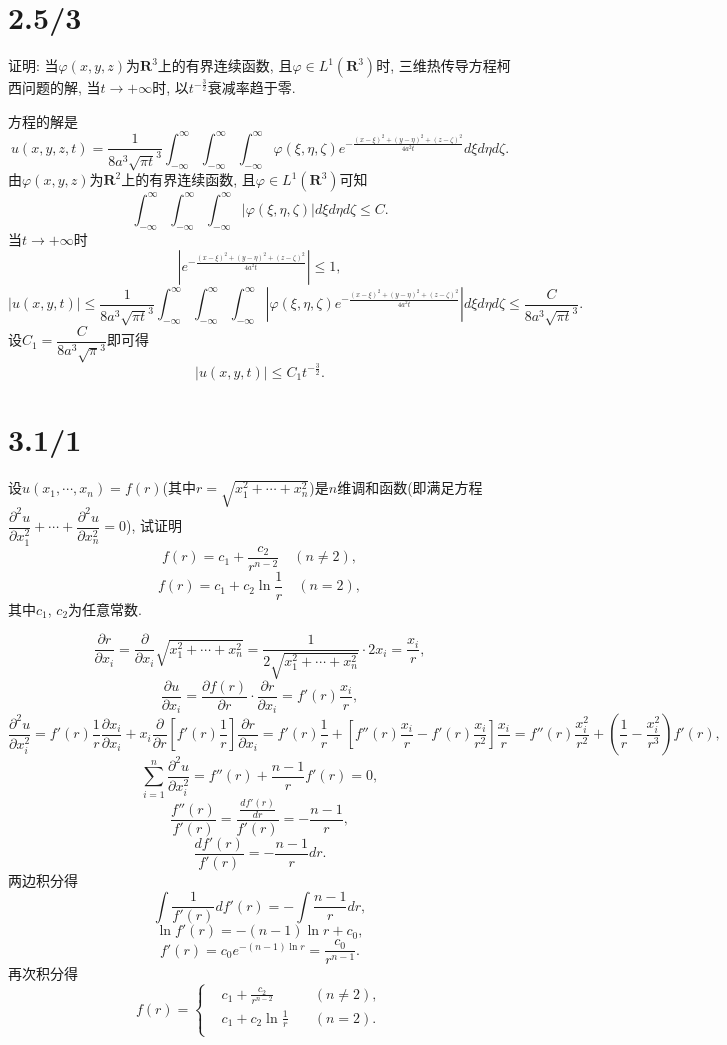 \documentclass[11pt,a4paper]{article}
\begin{document}
\section{2.5/3}
\begin{problem}
证明: 当$\varphi(x,y,z)$为$\mathbf{R}^3$上的有界连续函数, 且$\varphi\in L^1(\mathbf{R}^3)$时, 三维热传导方程柯西问题的解, 当$t\to+\infty$时, 以$t^{-\frac{3}{2}}$衰减率趋于零.
\end{problem}

方程的解是
$$u(x,y,z,t)=\frac{1}{8a^3\sqrt{\pi t}^3}\int_{-\infty}^\infty\int_{-\infty}^\infty\int_{-\infty}^\infty\varphi(\xi,\eta,\zeta)e^{-\frac{(x-\xi)^2+(y-\eta)^2+(z-\zeta)^2}{4a^2t}}d\xi d\eta d\zeta.$$
由$\varphi(x,y,z)$为$\mathbf{R}^2$上的有界连续函数, 且$\varphi\in L^1(\mathbf{R}^3)$可知
$$\int_{-\infty}^\infty\int_{-\infty}^\infty\int_{-\infty}^\infty|\varphi(\xi,\eta,\zeta)|d\xi d\eta d\zeta\leqslant C.$$
当$t\to+\infty$时
$$\left|e^{-\frac{(x-\xi)^2+(y-\eta)^2+(z-\zeta)^2}{4a^2t}}\right|\leqslant1,$$
$$|u(x,y,t)|\leqslant \frac{1}{8a^3\sqrt{\pi t}^3}\int_{-\infty}^\infty\int_{-\infty}^\infty\int_{-\infty}^\infty\left|\varphi(\xi,\eta,\zeta)e^{-\frac{(x-\xi)^2+(y-\eta)^2+(z-\zeta)^2}{4a^2t}}\right|d\xi d\eta d\zeta\leqslant\frac{C}{8a^3\sqrt{\pi t}^3}.$$
设$C_1=\dfrac{C}{8a^3\sqrt{\pi}^3}$即可得
$$|u(x,y,t)|\leqslant C_1t^{-\frac{3}{2}}.$$

\section{3.1/1}
\begin{problem}
设$u(x_1,\cdots,x_n)=f(r)$(其中$r=\sqrt{x_1^2+\cdots+x_n^2}$)是$n$维调和函数(即满足方程$\dfrac{\partial^2u}{\partial x_1^2}+\cdots+\dfrac{\partial^2u}{\partial x_n^2}=0$), 试证明
$$f(r)=c_1+\frac{c_2}{r^{n-2}}\quad(n\neq 2),$$
$$f(r)=c_1+c_2\ln\frac{1}{r}\quad(n=2),$$
其中$c_1$, $c_2$为任意常数.
\end{problem}

$$\frac{\partial r}{\partial x_i}=\frac{\partial}{\partial x_i}\sqrt{x_1^2+\cdots+x_n^2}=\frac{1}{2\sqrt{x_1^2+\cdots+x_n^2}}\cdot 2x_i=\frac{x_i}{r},$$
$$\frac{\partial u}{\partial x_i}=\frac{\partial f(r)}{\partial r}\cdot\frac{\partial r}{\partial x_i}=f'(r)\frac{x_i}{r},$$
$$\frac{\partial^2u}{\partial x_i^2}=f'(r)\frac{1}{r}\frac{\partial x_i}{\partial x_i}+x_i\frac{\partial}{\partial r}\left[f'(r)\frac{1}{r}\right]\frac{\partial r}{\partial x_i}=f'(r)\frac{1}{r}+\left[f''(r)\frac{x_i}{r}-f'(r)\frac{x_i}{r^2}\right]\frac{x_i}{r}=f''(r)\frac{x_i^2}{r^2}+\left(\frac{1}{r}-\frac{x_i^2}{r^3}\right)f'(r),$$
$$\sum_{i=1}^n\frac{\partial^2u}{\partial x_i^2}=f''(r)+\frac{n-1}{r}f'(r)=0,$$
$$\frac{f''(r)}{f'(r)}=\frac{\frac{df'(r)}{dr}}{f'(r)}=-\frac{n-1}{r},$$
$$\frac{df'(r)}{f'(r)}=-\frac{n-1}{r}dr.$$
两边积分得
$$\int\frac{1}{f'(r)}df'(r)=-\int\frac{n-1}{r}dr,$$
$$\ln f'(r)=-(n-1)\ln r+c_0,$$
$$f'(r)=c_0e^{-(n-1)\ln r}=\frac{c_0}{r^{n-1}}.$$
再次积分得
$$f(r)=\left\{\begin{aligned}
     & c_1+\frac{c_2}{r^{n-2}} & \quad (n\neq2), \\
     & c_1+c_2\ln\frac{1}{r}   & \quad (n=2).    \\
  \end{aligned}\right.$$
\end{document}
